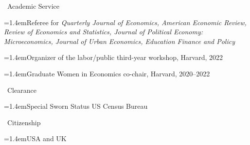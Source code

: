 \documentclass[11pt]{article}
\newcommand{\entryindent}{1.4em}  %
\newcommand{\cvsection}[1]{%
  \par\addvspace{12pt}%
  {\Large\textcolor{cvred}{\textemdash}\ #1}\par
  \nobreak\vspace{4pt}\nobreak}
\newcommand{\hang}{\hangindent=\entryindent\hangafter=1\relax}
\newcommand{\entrygap}{\par\addvspace{6pt}}
\begin{document}
\cvsection{Academic Service}
\hang Referee for \emph{Quarterly Journal of Economics, American Economic Review,
Review of Economics and Statistics, Journal of Political Economy: Microeconomics,
Journal of Urban Economics, Education Finance and Policy}\entrygap
\hang Organizer of the labor/public third-year workshop, Harvard, 2022\par
\hang Graduate Women in Economics co-chair, Harvard, 2020--2022\par

\cvsection{Clearance}
\hang Special Sworn Status US Census Bureau\par

\cvsection{Citizenship}
\hang USA and UK\par
\end{document}
